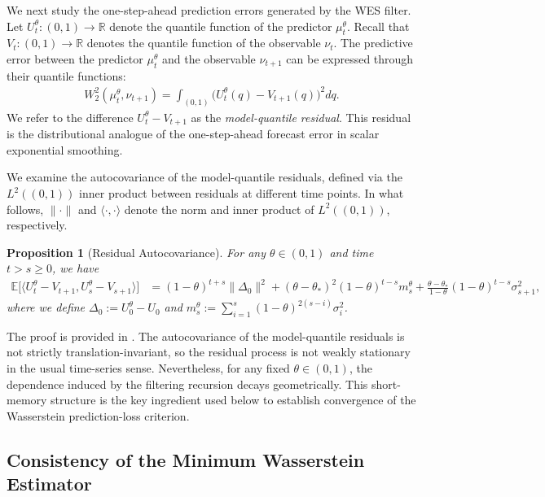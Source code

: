 \documentclass[a4paper, 11pt]{article}
\newcommand{\R}{\mathbb{R}}
\newcommand{\E}{\mathbb E}
\newtheorem{proposition}{Proposition}
\theoremstyle{definition}
\begin{document}
We next study the one-step-ahead prediction errors generated by the WES filter.
Let $U_t^\theta: (0, 1) \to \R$ denote the quantile function of the predictor $\mu_t^\theta$. 
Recall that $V_t: (0, 1) \to \R$ denotes the quantile function of the observable $\nu_t$.
The predictive error between the predictor $\mu_t^\theta$ and the observable $\nu_{t+1}$ can be expressed through their quantile functions:
\begin{align}
	W_2^2(\mu_t^\theta, \nu_{t+1}) = \int_{(0,1)} \big( U_t^\theta(q) - V_{t+1}(q) \big)^2 dq . \label{eq:model_residual_expression}
\end{align}
We refer to the difference $U_t^\theta - V_{t+1}$ as the \emph{model-quantile residual}.
This residual is the distributional analogue of the one-step-ahead forecast error in scalar exponential smoothing.

We examine the autocovariance of the model-quantile residuals, defined via the $L^2((0,1))$ inner product between residuals at different time points.
In what follows, $\| \cdot \|$ and $\langle \cdot, \cdot \rangle$ denote the norm and inner product of $L^2((0, 1))$, respectively.

\begin{proposition}[Residual Autocovariance] \label{prop:residual_autocovariance}
	For any $\theta \in (0, 1)$ and time $t > s \ge 0$, we have
    \begin{align}
        \E\Big[ \big\langle U_{t}^\theta - V_{t+1}, U_{s}^\theta - V_{s+1} \big\rangle \Big] 
        & = (1 -\theta)^{t+s} \| \Delta_0 \|^2
        + (\theta-\theta_*)^2 (1-\theta)^{t-s}m_s^\theta +\frac{\theta - \theta_*}{1 - \theta} (1 - \theta)^{t-s} \sigma_{s+1}^2,
    \end{align}
    where we define $\Delta_0 := U_0^\theta - U_0$ and $m_s^\theta := \sum_{i=1}^{s} (1 - \theta)^{2(s-i)} \sigma_i^2$.
\end{proposition}

The proof is provided in .
The autocovariance of the model-quantile residuals is not strictly translation-invariant, so the residual process is not weakly stationary in the usual time-series sense.
Nevertheless, for any fixed $\theta\in(0,1)$, the dependence induced by the filtering recursion decays geometrically.
This short-memory structure is the key ingredient used below to establish convergence of the Wasserstein prediction-loss criterion.

\subsection{Consistency of the Minimum Wasserstein Estimator} \label{sec:convergence}
\end{document}
